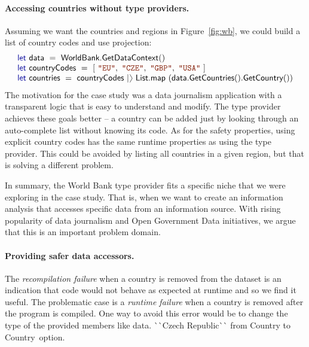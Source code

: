 \documentclass[submission,copyright,creativecommons]{eptcs}
\newcommand{\rangl}{\begin{picture}(4.5,7)
\put(.9,2.5){\rotatebox{120}{\line(1,0){5.5}}}
\put(.9,2.5){\rotatebox{240}{\line(1,0){5.5}}}
\end{picture}}
\newcommand{\kvd}[1]{\textnormal{\textcolor{kvdclr}{\sffamily #1}}}
\newcommand{\str}[1]{\textnormal{\textcolor{strclr}{\ttfamily "#1"}}}
\newcommand{\ident}[1]{\textnormal{\sffamily #1}}
\newcommand{\lident}[1]{\textnormal{\sffamily
  \`{}\hspace{-0.25em}\`{}\hspace{-0.1em}#1\`{}\hspace{-0.25em}\`{}}}
\begin{document}
\vspace{-1em}
\paragraph{Accessing countries without type providers.} Assuming we want the countries
and regions in Figure~\ref{fig:wb}, we could build a list of country codes and use projection:
%
\begin{equation*}
\begin{array}{l}
 \kvd{let}~\ident{data}~=~\ident{WorldBank.GetDataContext}() \\
 \kvd{let}~\ident{countryCodes}~=~\lbrack~\str{EU},~\str{CZE},~\str{GBP},~\str{USA}~\rbrack \\
 \kvd{let}~\ident{countries}~=~\ident{countryCodes}~|\rangl~\ident{List.map}~(\ident{data.GetCountries}().\ident{GetCountry}())
\end{array}
\end{equation*}
%
The motivation for the case study was a data journalism application with a transparent logic
that is easy to understand and modify. The type provider achieves these goals better -- a country
can be added just by looking through an auto-complete list without knowing its code.
As for the safety properties, using explicit country codes has the same runtime properties as using
the type provider. This could be avoided by listing all countries in a given region, but that is
solving a different problem.

In summary, the World Bank type provider fits a specific niche that we were exploring in the case
study. That is, when we want to create an information analysis that accesses specific data from
an information source. With rising popularity of data journalism and Open Government Data
initiatives, we argue that this is an important problem domain.

\vspace{-1em}
\paragraph{Providing safer data accessors.}
The \emph{recompilation failure} when a country is removed from the dataset is an indication that
code would not behave as expected at runtime and so we find it useful. The problematic case is
a \emph{runtime failure} when a country is removed after the program is compiled. One way to
avoid this error would be to change the type of the provided members like
\ident{data.}\lident{Czech Republic} from \ident{Country} to \ident{Country~option}.
\end{document}
